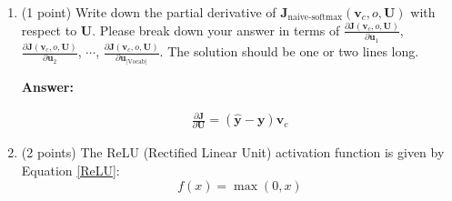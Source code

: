\documentclass{article}
\newenvironment{answer}{
    {\bf Answer:} \sf \begingroup\color{red}
}{\endgroup}%
\begin{document}
\begin{enumerate}[label=(\alph*)]
\begin{shaded}
\begin{answer}
\begin{itemize}
    \item if $w = o$,
        \begin{align*}
            \frac{\partial \bm J}{\partial \bm u_w}
            &= \frac{\exp(\bm u_{w}^\top \bm v_c) \bm{v}_{c}}{\sum_{w \in \text{Vocab}} \exp(\bm u_{w}^\top \bm v_c)} - \bm{v}_c \\
            &= \hat{\bm y}_w \bm{v}_c - \bm{v}_c \\
            &= (\hat{\bm y}_w - 1) \bm{v}_c
        \end{align*}
    \item if $w \neq o$,
        \begin{align*}
            \frac{\partial \bm J}{\partial \bm u_w}
            &= \frac{\exp(\bm u_{w}^\top \bm v_c) \bm{v}_{c}}{\sum_{w \in \text{Vocab}} \exp(\bm u_{w}^\top \bm v_c)} \\
            &= \hat{\bm y}_w \bm{v}_c
        \end{align*}
\end{itemize}

\end{answer}
\end{shaded}

\item (1 point) Write down the partial derivative of $\bm J_{\text{naive-softmax}}(\bm v_c, o, \bm U)$ with respect to $\bm U$. Please break down your answer in terms of $\frac{\partial \bm J(\bm v_c, o, \bm U)}{\partial \bm u_1}$, $\frac{\partial \bm J(\bm v_c, o, \bm U)}{\partial \bm u_2}$, $\cdots$, $\frac{\partial \bm J(\bm v_c, o, \bm U)}{\partial \bm u_{|\text{Vocab}|}}$. The solution should be one or two lines long.

\begin{shaded}
\begin{answer}

\begin{align*}
    \frac{\partial \bm J}{\partial \bm U}
    = (\hat{\bm y} - \bm{y}) \bm{v}_c
\end{align*}

\end{answer}
\end{shaded}

\item (2 points) The ReLU (Rectified Linear Unit) activation function is given by Equation \ref{ReLU}:
\begin{equation}
    \label{ReLU}
    f(x) = \max(0, x)
\end{equation}


\end{enumerate}
\end{document}
